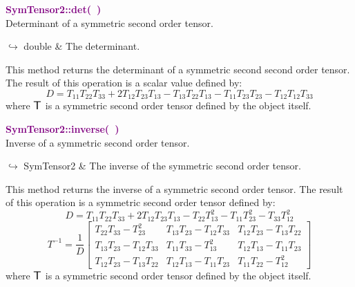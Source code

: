 \textcolor{purple}{\textbf{SymTensor2::det(~)}}\label{SymTensor2::det()}\\
Determinant of a symmetric second order tensor.\vspace*{-0.5em}
\begin{tcolorbox}[grow to left by=-1cm, width=\textwidth-1cm,myArgs,tabularx={l|R}]
$\hookrightarrow$ double & The determinant.
\end{tcolorbox}

This method returns the determinant of a symmetric second second order tensor.
The result of this operation is a scalar value defined by:
\begin{equation*}
D = T_{11} T_{22} T_{33} + 2 T_{12} T_{23} T_{13} - T_{13} T_{22} T_{13} - T_{11} T_{23} T_{23} - T_{12} T_{12} T_{33}
\end{equation*}
where $\mbox{\large\ensuremath{\mathsf{T}}}$ is a symmetric second order tensor defined by the object itself.

\textcolor{purple}{\textbf{SymTensor2::inverse(~)}}\label{SymTensor2::inverse()}\\
Inverse of a symmetric second order tensor.\vspace*{-0.5em}
\begin{tcolorbox}[grow to left by=-1cm, width=\textwidth-1cm,myArgs,tabularx={l|R}]
$\hookrightarrow$ SymTensor2 & The inverse of the symmetric second order tensor.
\end{tcolorbox}

This method returns the inverse of a symmetric second order tensor.
The result of this operation is a symmetric second order tensor defined by:
\begin{equation*}
D = T_{11} T_{22} T_{33} + 2 T_{12} T_{23} T_{13} - T_{22} T_{13}^2 - T_{11} T_{23}^2 - T_{33} T_{12}^2
\end{equation*}
\begin{equation*}
T^{-1} = \frac {1}{D} \left[\begin{array}{ccc}
  T_{22}T_{33}-T_{23}^2&T_{13}T_{23}-T_{12}T_{33}&T_{12}T_{23}-T_{13}T_{22}\\
  T_{13}T_{23}-T_{12}T_{33}&T_{11}T_{33}-T_{13}^2&T_{12}T_{13}-T_{11}T_{23}\\
  T_{12}T_{23}-T_{13}T_{22}&T_{12}T_{13}-T_{11}T_{23}&T_{11}T_{22}-T_{12}^2
  \end{array}
  \right]
\end{equation*}
where $\mbox{\large\ensuremath{\mathsf{T}}}$ is a symmetric second order tensor defined by the object itself.

